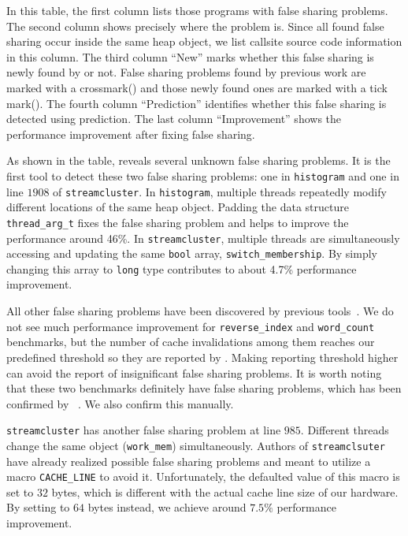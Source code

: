In this table, the first column lists those programs with false sharing problems. 
The second column shows precisely where the problem is. Since all found false sharing 
occur inside the same heap object, we list callsite source code information in this column.
The third column ``New'' marks whether this false sharing is newly found by \Predator{} or not.
False sharing problems found by previous work are marked with a crossmark(\xmark{}) and those 
newly found ones are marked with a tick mark(\cmark{}).
The fourth column ``Prediction'' identifies whether this false sharing is detected using prediction.
The last column ``Improvement'' shows the performance improvement after fixing false sharing. 

As shown in the table, \Predator{} reveals several unknown false sharing problems. 
It is the first tool to detect these two false sharing problems: one in \texttt{histogram} 
and one in line $1908$ of \texttt{streamcluster}. 
In \texttt{histogram}, multiple threads repeatedly modify different locations of the same heap object. 
Padding the data structure \texttt{thread\_arg\_t} fixes the false sharing problem and 
helps to improve the performance around 46\%.
In \texttt{streamcluster}, multiple threads are simultaneously accessing and updating 
the same \texttt{bool} array, \texttt{switch\_membership}. 
By simply changing this array to \texttt{long} type contributes to about 4.7\% performance improvement.

All other false sharing problems have been discovered by previous tools~\cite{sheriff}.
We do not see much performance improvement for \texttt{reverse\_index} and 
\texttt{word\_count} benchmarks, but the number of cache invalidations 
among them reaches our predefined threshold so they are reported by \predator{}.
Making reporting threshold higher can avoid the report of insignificant false sharing problems.
It is worth noting that these two benchmarks definitely have false sharing problems,
which has been confirmed by \Sheriff~\cite{sheriff}. 
We also confirm this manually. 

\texttt{streamcluster} has another false sharing problem at line $985$. 
Different threads change the same object (\texttt{work\_mem}) simultaneously. 
Authors of \texttt{streamclsuter} have already realized possible
false sharing problems and meant to utilize a macro \texttt{CACHE\_LINE} to avoid it. Unfortunately,
the defaulted value of this macro is set to $32$ bytes, which is different with the actual
cache line size of our hardware. By setting to $64$ bytes instead, we achieve around $7.5\%$ performance
improvement.

